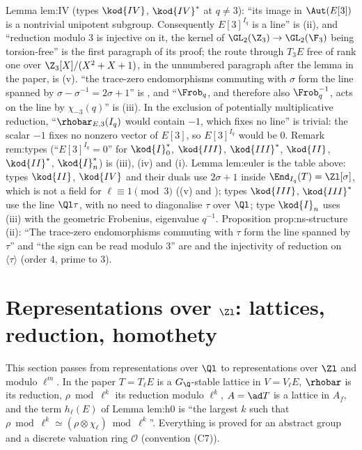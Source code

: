 \begin{paperlink}
Lemma lem:IV (types $\kod{IV}$, $\kod{IV}^*$ at $q\ne3$): ``its image in $\Aut(E[3])$ is a nontrivial unipotent subgroup. Consequently $E[3]^{I_q}$ is a
line'' is (ii), and ``reduction modulo $3$ is injective on it, the kernel of $\GL_2(\Z_3)\to\GL_2(\F_3)$ being
torsion-free'' is the first paragraph of its proof; the route through $T_3E$ free of rank one over $\Z_3[X]/(X^2+X+1)$, in the unnumbered paragraph after the lemma in the paper, is (v). ``the trace-zero
endomorphisms commuting with $\sigma$ form the line spanned by $\sigma-\sigma^{-1}=2\sigma+1$'' is , and ``$\Frob_q$, and therefore also
$\Frob_q^{-1}$, acts on the line by $\chi_{-3}(q)$'' is (iii). In the exclusion of potentially multiplicative reduction,
``$\rhobar_{E,3}(I_q)$ would contain $-1$, which fixes no line'' is trivial: the scalar $-1$ fixes no nonzero vector of $E[3]$, so $E[3]^{I_q}$ would be $0$. Remark rem:types (``$E[3]^{I_q}=0$''
for $\kod{I}_0^*$, $\kod{III}$, $\kod{III}^*$, $\kod{II}$, $\kod{II}^*$, $\kod{I}_n^*$) is (iii), (iv) and (i). Lemma lem:euler is the
table above: types $\kod{II}$, $\kod{IV}$ and their duals use $2\sigma+1$ inside $\End_{I_q}(T)=\Zl[\sigma]$, which is not a field for $\ell\equiv1\pmod3$ ((v) and
); types $\kod{III}$, $\kod{III}^*$ use the line $\Ql\tau$, with no need to diagonalise $\tau$ over $\Ql$; type $\kod{I}_n$ uses
(iii) with the geometric Frobenius, eigenvalue $q^{-1}$. Proposition prop:ns-structure (ii): ``The trace-zero
endomorphisms commuting with $\tau$ form the line spanned by $\tau$'' and ``the sign can be read modulo $3$'' are  and the
injectivity of reduction on $\langle\tau\rangle$ (order $4$, prime to $3$).
\end{paperlink}

\section{Representations over \texorpdfstring{$\Zl$}{Zl}: lattices, reduction, homothety}\label{sec:reps:lattices}

This section passes from representations over $\Ql$ to representations over $\Zl$ and modulo $\ell^m$. In the paper $T=T_\ell E$ is a
$G_\Q$-stable lattice in $V=V_\ell E$, $\rhobar$ is its reduction, $\rho\bmod\ell^k$ its reduction modulo $\ell^k$, $A=\ad T$ is a lattice in $A_f$, and the
term $h_\ell(E)$ of Lemma lem:h0 is ``the largest $k$ such that $\rho\bmod\ell^k\simeq(\rho\otimes\chi_\ell)\bmod\ell^k$''. Everything is proved for an abstract
group and a discrete valuation ring $\mathcal{O}$ (convention (C7)).

